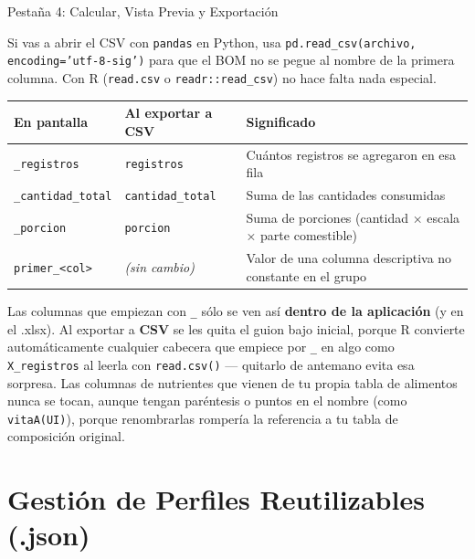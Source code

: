 \documentclass[11pt,a4paper]{article}
\begin{document}
\begin{stepcard}{Pestaña 4: Calcular, Vista Previa y Exportación}
\begin{tipbox}
Si vas a abrir el CSV con \texttt{pandas} en Python, usa \texttt{pd.read\_csv(archivo, encoding='utf-8-sig')} para que el BOM no se pegue al nombre de la primera columna. Con R (\texttt{read.csv} o \texttt{readr::read\_csv}) no hace falta nada especial.
\end{tipbox}

\begin{glassbox}
\begin{tabularx}{\linewidth}{@{}>{\raggedright\arraybackslash}p{2.6cm} >{\raggedright\arraybackslash}p{3.1cm} X@{}}
\toprule
\textbf{En pantalla} & \textbf{Al exportar a CSV} & \textbf{Significado} \\
\midrule
\texttt{\_registros} & \texttt{registros} & Cuántos registros se agregaron en esa fila \\[2pt]
\texttt{\_cantidad\_total} & \texttt{cantidad\_total} & Suma de las cantidades consumidas \\[2pt]
\texttt{\_porcion} & \texttt{porcion} & Suma de porciones (cantidad × escala × parte comestible) \\[2pt]
\texttt{primer\_<col>} & \textit{(sin cambio)} & Valor de una columna descriptiva no constante en el grupo \\
\bottomrule
\end{tabularx}
\vspace{4pt}
Las columnas que empiezan con \texttt{\_} sólo se ven así \textbf{dentro de la aplicación} (y en el .xlsx). Al exportar a \textbf{CSV} se les quita el guion bajo inicial, porque R convierte automáticamente cualquier cabecera que empiece por \texttt{\_} en algo como \texttt{X\_registros} al leerla con \texttt{read.csv()} --- quitarlo de antemano evita esa sorpresa. Las columnas de nutrientes que vienen de tu propia tabla de alimentos nunca se tocan, aunque tengan paréntesis o puntos en el nombre (como \texttt{vitaA(UI)}), porque renombrarlas rompería la referencia a tu tabla de composición original.
\end{glassbox}
\end{stepcard}

\vspace{0.5cm}

\section{Gestión de Perfiles Reutilizables (.json)}
\end{document}

